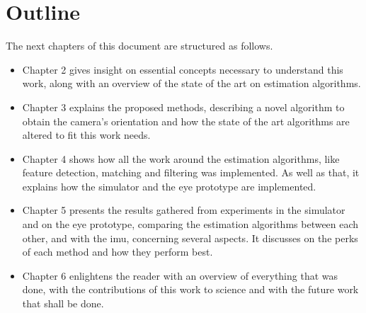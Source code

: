  		
\section{Outline}
\label{cha1:outline}

The next chapters of this document are structured as follows.
\begin{itemize}
\item	Chapter 2 gives insight on essential concepts necessary to understand this work, along with an overview of the state of the art on estimation algorithms.
	
\item	Chapter 3 explains the proposed methods, describing a novel algorithm to obtain the camera's orientation and how the state of the art algorithms are altered to fit this work needs.

\item   Chapter 4 shows how all the work around the estimation algorithms, like feature detection, matching and filtering was implemented. As well as that, it explains how the simulator and the eye prototype are implemented.
	
\item	Chapter 5 presents the results gathered from experiments in the simulator and on the eye prototype, comparing the estimation algorithms between each other, and with the \acrshort{imu}, concerning several aspects. It discusses on the perks of each method and how they perform best.
	
\item	Chapter 6 enlightens the reader with an overview of everything that was done, with the contributions of this work to science and with the future work that shall be done.
	

	
\end{itemize}



